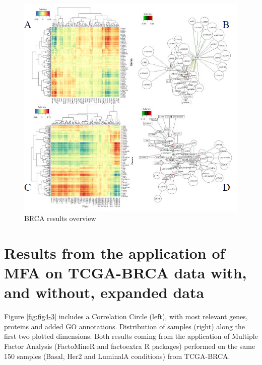 \documentclass[a4paper, nobind]{templates/ociamthesis}
\begin{document}
\begin{figure}

{\centering \includegraphics[width=0.95\linewidth]{figures/chapter4/4-2_BRCA_results_overview} 

}

\caption{BRCA results overview}\label{fig:fig4-2}
\end{figure}

\hypertarget{results-from-the-application-of-mfa-on-tcga-brca-data-with-and-without-expanded-data}{%
\section{Results from the application of MFA on TCGA-BRCA data with, and without, expanded data}\label{results-from-the-application-of-mfa-on-tcga-brca-data-with-and-without-expanded-data}}

Figure \ref{fig:fig4-3} includes a Correlation Circle (left), with most relevant genes, proteins and added GO annotations. Distribution of samples (right) along the first two plotted dimensions. Both results coming from the application of Multiple Factor Analysis (FactoMineR and factoextra R packages) performed on the same 150 samples (Basal, Her2 and LuminalA conditions) from TCGA-BRCA.
\end{document}
